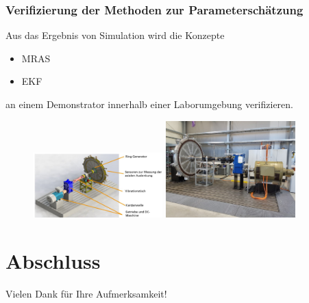 \documentclass[serif,11pt, xcolor=table]{beamer}
\begin{document}
\begin{frame}
		\frametitle{Verifizierung der Methoden zur Parameterschätzung}
Aus das Ergebnis von Simulation wird die Konzepte \\
		\begin{itemize}
			\item MRAS
			
			\item EKF
		\end{itemize}
an einem Demonstrator innerhalb einer Laborumgebung verifizieren.		
			\begin{figure}[htbp]
			\centering
			\begin{minipage}[t]{0.45\textwidth}
				\centering
				\includegraphics[width=5cm]{Abbildungen/Teststand.JPG}
				
			\end{minipage}
			\begin{minipage}[t]{0.48\textwidth}
				\centering
				\includegraphics[width=5cm]{Abbildungen/Teststand2.JPG}
				
			\end{minipage}
		\end{figure}	
		
	\end{frame}
	\section{Abschluss}
	\begin{frame}
		
		\Large{\centerline{Vielen Dank für Ihre Aufmerksamkeit!}}
		
	\end{frame}
	
\end{document}
